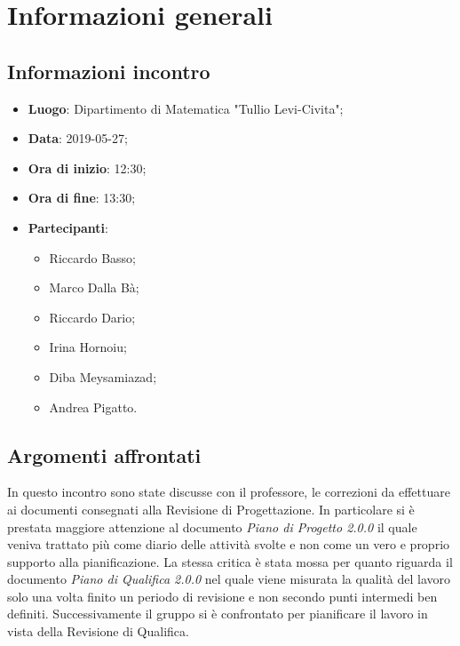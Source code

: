 \section{Informazioni generali}

\subsection{Informazioni incontro}
\begin{itemize}
	\item \textbf{Luogo}: Dipartimento di Matematica "Tullio Levi-Civita";
	\item \textbf{Data}: 2019-05-27;
	\item \textbf{Ora di inizio}: 12:30;
	\item \textbf{Ora di fine}: 13:30;
	\item \textbf{Partecipanti}: 
	\begin{itemize}
		\item Riccardo Basso;
		\item Marco Dalla Bà;
		\item Riccardo Dario;
		\item Irina Hornoiu;
		\item Diba Meysamiazad;
		\item Andrea Pigatto.	
	\end{itemize}
\end{itemize}

\subsection{Argomenti affrontati}
In questo incontro sono state discusse con il professore, le correzioni da effettuare ai documenti consegnati alla Revisione di Progettazione.
In particolare si è prestata maggiore attenzione al documento \textit{Piano di Progetto 2.0.0} il quale veniva trattato più come diario delle attività svolte e non come un vero e proprio supporto alla pianificazione. La stessa critica è stata mossa per quanto riguarda il documento \textit{Piano di Qualifica 2.0.0} nel quale viene misurata la qualità del lavoro solo una volta finito un periodo di revisione e non secondo punti intermedi ben definiti.
Successivamente il gruppo si è confrontato per pianificare il lavoro in vista della Revisione di Qualifica.
